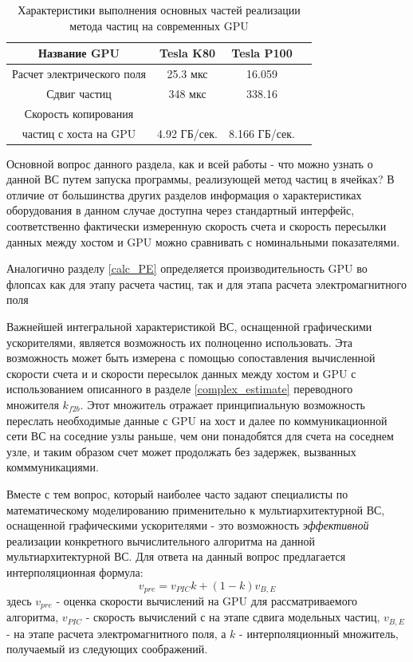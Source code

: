 \begin{table}[ht]
	\begin{center}
		\caption{Характеристики выполнения основных частей реализации метода частиц на современных GPU}
		\begin{tabular}{|c|c|c|c|}
			\hline
			Название GPU                &  Tesla K80   & Tesla P100 \\ \hline
			Расчет электрического поля  &  25.3 мкс    &  16.059    \\ \hline
			Сдвиг частиц                &  348 мкс     &  338.16    \\ \hline
			Скорость копирования        &              &            \\
			частиц с хоста на GPU       & 4.92 ГБ/сек. &8.166 ГБ/сек.  \\ \hline
		\end{tabular}
		\label{PerfGPU}
	\end{center}
\end{table}

Основной вопрос данного раздела, как и всей работы - что можно узнать о данной ВС путем запуска программы, реализующей метод частиц в ячейках? В отличие от 	большинства других разделов информация о характеристиках оборудования в данном случае доступна через стандартный интерфейс, соответственно фактически измеренную скорость счета и скорость пересылки данных между хостом и GPU можно сравнивать с номинальными показателями.

Аналогично разделу \ref{calc_PE} определяется производительность GPU во флопсах как для этапу расчета частиц, так и для этапа расчета электромагнитного поля

Важнейшей интегральной характеристикой ВС, оснащенной графическими ускорителями, является возможность их полноценно использовать. Эта возможность
может быть измерена с помощью сопоставления вычисленной скорости счета и и скорости пересылок данных между хостом и GPU с использованием описанного 
в разделе \ref{complex_estimate} переводного множителя $k_{f2b}$. Этот множитель отражает принципиальную возможность переслать необходимые данные с GPU на хост и далее по коммуникационной сети ВС на соседние узлы раньше, чем они понадобятся для счета на соседнем узле, и таким образом счет может продолжать без задержек, вызванных комммуникациями.

Вместе с тем вопрос, который наиболее часто задают специалисты по математическому моделированию применительно к мультиархитектурной ВС, оснащенной графическими ускорителями - это возможность \textit{эффективной} реализации конкретного вычислительного алгоритма на данной мультиархитектурной ВС.
Для ответа на данный вопрос предлагается интерполяционная формула:
\begin{equation}
v_{pre} = v_{PIC} k + (1-k) v_{B,E}
\end{equation} 
здесь $ v_{pre}$ - оценка скорости вычислений на GPU для рассматриваемого алгоритма, $v_{PIC}$ - скорость вычислений с на этапе сдвига модельных частиц, $v_{B,E}$ - на этапе расчета электромагнитного поля, а $k$ - интерполяционный множитель, получаемый из следующих соображений.

